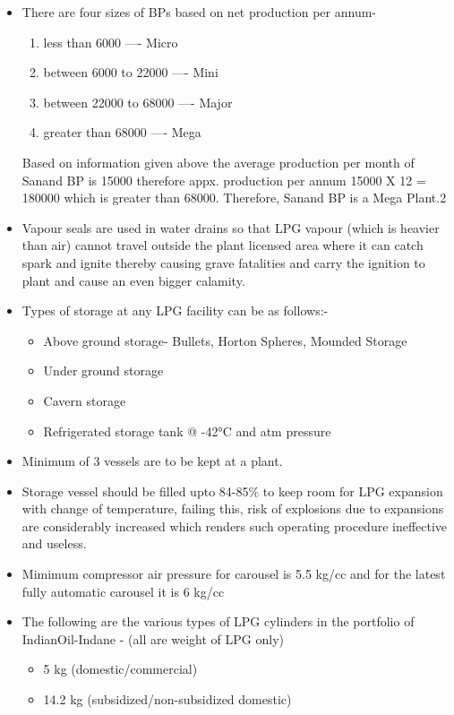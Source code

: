 \documentclass{report}
\begin{document}
	\begin{itemize}
		\item There are four sizes of BPs based on net production per annum-
		\begin{enumerate}
			\item less than 6000 ---- Micro
			\item between 6000 to 22000 ---- Mini
			\item between 22000 to 68000 ---- Major
			\item greater than 68000 ---- Mega
		\end{enumerate}
		Based on information given above the average production per month of Sanand BP is 15000 therefore appx. production per annum 15000 X 12 = 180000 which is greater than 68000. Therefore, Sanand BP is a Mega Plant.2
		\item Vapour seals are used in water drains so that LPG vapour (which is heavier than air) cannot travel outside the plant licensed area where it can catch spark and ignite thereby causing grave fatalities and carry the ignition to plant and cause an even bigger calamity.
		\item Types of storage at any LPG facility can be as follows:-
		\begin{itemize}
			\item Above ground storage- Bullets, Horton Spheres, Mounded Storage
			\item Under ground storage
			\item Cavern storage
			\item Refrigerated storage tank @ \ang{-42}C and atm pressure
		\end{itemize}
		\item Minimum of 3 vessels are to be kept at a plant.
		\item Storage vessel should be filled upto 84-85\% to keep room for LPG expansion with change of temperature, failing this, risk of explosions due to expansions are considerably increased which renders such operating procedure ineffective and useless. 
		\item Mimimum compressor air pressure for carousel is 5.5 kg/cc and for the latest fully automatic carousel it is 6 kg/cc
		\item The following are the various types of LPG cylinders in the portfolio of IndianOil-Indane - (all are weight of LPG only)
		\begin{itemize}
			\item 5 kg (domestic/commercial)
			\item 14.2 kg (subsidized/non-subsidized domestic)

\end{itemize}
\end{itemize}
\end{document}
